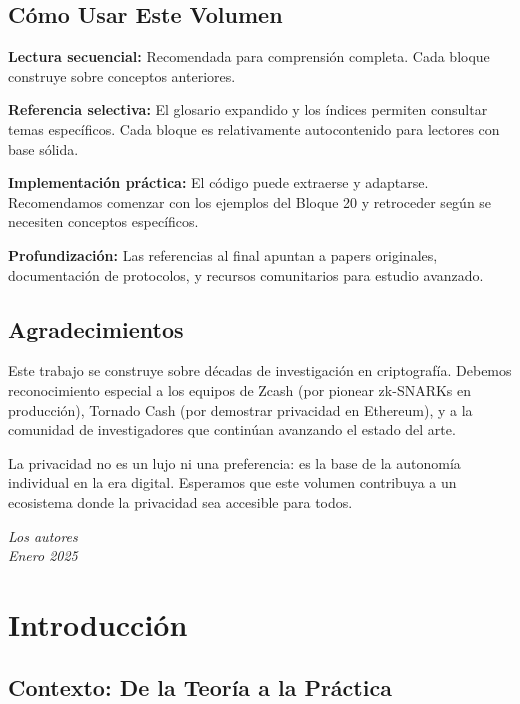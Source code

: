 \documentclass[11pt,a4paper,twoside]{book}
\theoremstyle{definition}
\theoremstyle{remark}
\begin{document}
\section*{Cómo Usar Este Volumen}

\textbf{Lectura secuencial:} Recomendada para comprensión completa. Cada bloque construye sobre conceptos anteriores.

\textbf{Referencia selectiva:} El glosario expandido y los índices permiten consultar temas específicos. Cada bloque es relativamente autocontenido para lectores con base sólida.

\textbf{Implementación práctica:} El código puede extraerse y adaptarse. Recomendamos comenzar con los ejemplos del Bloque 20 y retroceder según se necesiten conceptos específicos.

\textbf{Profundización:} Las referencias al final apuntan a papers originales, documentación de protocolos, y recursos comunitarios para estudio avanzado.

\section*{Agradecimientos}

Este trabajo se construye sobre décadas de investigación en criptografía. Debemos reconocimiento especial a los equipos de Zcash (por pionear zk-SNARKs en producción), Tornado Cash (por demostrar privacidad en Ethereum), y a la comunidad de investigadores que continúan avanzando el estado del arte.

La privacidad no es un lujo ni una preferencia: es la base de la autonomía individual en la era digital. Esperamos que este volumen contribuya a un ecosistema donde la privacidad sea accesible para todos.

\vspace{1cm}
\begin{flushright}
\textit{Los autores}\\
\textit{Enero 2025}
\end{flushright}

\clearpage

\chapter*{Introducción}

\section*{Contexto: De la Teoría a la Práctica}
\end{document}
